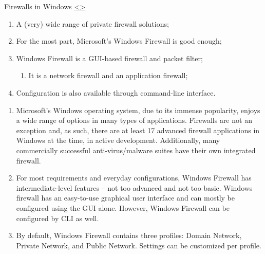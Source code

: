 \documentclass[12pt]{extarticle}
\newenvironment{instructionblock}{\Large\bgroup}{\egroup}
\newcommand{\ben}{\begin{enumerate}}
\newcommand{\een}{\end{enumerate}}
\begin{document}
\pagebreak
\begin{slide}{ Firewalls in Windows }{ \hyperref[slide 11]{\textless}\hyperref[slide 13]{\textgreater} }
    \begin{instructionblock}
        \begin{enumerate}
            \item A (very) wide range of private firewall solutions;
            \item For the most part, Microsoft's Windows Firewall is good enough;
            \item Windows Firewall is a GUI-based firewall and packet filter;
        		\ben
        		\item It is a network firewall and an application firewall;
        		\een
            \item Configuration is also available through command-line interface.
        \end{enumerate}
    \end{instructionblock}
\end{slide}


\vspace{8mm}
\ben

\item { Microsoft's Windows operating system, due to its immense popularity, enjoys a wide range of options in many types of applications. Firewalls are not an exception and, as such, there are at least 17 advanced firewall applications in Windows at the time, in active development. Additionally, many commercially successful anti-virus/malware suites have their own integrated firewall. }

\item { For most requirements and everyday configurations, Windows Firewall has intermediate-level features -- not too advanced and not too basic. Windows firewall has an easy-to-use graphical user interface and can mostly be configured using the GUI alone. However, Windows Firewall can be configured by CLI as well. }

\item { By default, Windows Firewall contains three profiles: Domain Network, Private Network, and Public Network. Settings can be customized per profile. }

\een


\end{document}
